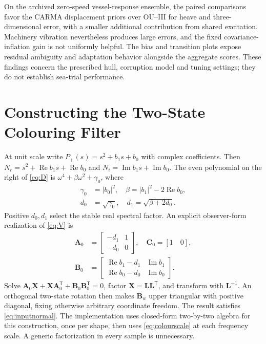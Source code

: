 \documentclass[conference]{IEEEtran}
\newcommand{\mt}[1]{\bm{#1}}
\newcommand{\tr}{^{\mathsf T}}
\DeclareMathOperator{\Rea}{Re}
\DeclareMathOperator{\Ima}{Im}
\begin{document}
On the archived zero-speed vessel-response ensemble, the paired comparisons favor the
CARMA displacement priors over OU--III for heave and three-dimensional
error, with a smaller additional contribution from shared excitation.
Machinery vibration nevertheless produces large errors, and the fixed
covariance-inflation gain is not uniformly helpful. The bias and transition
plots expose residual ambiguity and adaptation behavior alongside the
aggregate scores. These findings concern the prescribed hull, corruption
model and tuning settings; they do not establish sea-trial performance.

\FloatBarrier
\appendices
\section{Constructing the Two-State Colouring Filter}
\label{app:colour}
At unit scale write $P_+(s)=s^2+b_1s+b_0$ with complex coefficients.
Then $N_r=s^2+\Rea b_1s+\Rea b_0$ and
$N_i=\Ima b_1s+\Ima b_0$. The even polynomial on the right of
\cref{eq:D} is $\omega^4+\beta\omega^2+\gamma_0$, where
\begin{align}
 \gamma_0&=|b_0|^2,\quad \beta=|b_1|^2-2\Rea b_0,\nonumber\\
 d_0&=\sqrt{\gamma_0},\quad d_1=\sqrt{\beta+2d_0}.
 \label{eq:Dcoeff}
\end{align}
Positive $d_0,d_1$ select the stable real spectral factor. An explicit
observer-form realization of \cref{eq:V} is
\begin{align}
 \mt A_0&=\begin{bmatrix}-d_1&1\\-d_0&0\end{bmatrix},\quad
 \mt C_0=[1\quad0],\nonumber\\
 \mt B_0&=\begin{bmatrix}\Rea b_1-d_1&\Ima b_1\\
                         \Rea b_0-d_0&\Ima b_0\end{bmatrix}.
 \label{eq:observercolour}
\end{align}
Solve $\mt A_0\mt X+\mt X\mt A_0\tr+\mt B_0\mt B_0\tr=0$,
factor $\mt X=\mt L\mt L\tr$, and transform with $\mt L^{-1}$.
An orthogonal two-state rotation then makes $\mt B_w$ upper triangular
with positive diagonal, fixing otherwise arbitrary coordinate freedom.
The result satisfies \cref{eq:inputnormal}. The implementation uses
closed-form two-by-two algebra for this construction, once per shape,
then uses \cref{eq:colourscale} at each frequency scale. A generic
factorization in every sample is unnecessary.
\end{document}
